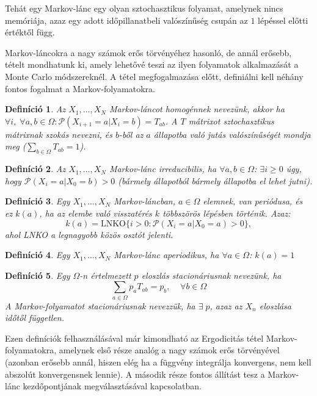 \documentclass[10pt,a4paper]{article}
\numberwithin{equation}{subsection}
\numberwithin{figure}{section}
\newtheorem{definition}{Definíció}[section]
\begin{document}
Tehát egy Markov-lánc egy olyan sztochasztikus folyamat, amelynek nincs memóriája, azaz egy adott időpillanatbeli valószínűség csupán az $1$ lépéssel előtti értéktől függ. 

Markov-láncokra a nagy számok erős törvényéhez hasonló, de annál erősebb, tételt mondhatunk ki, amely lehetővé teszi az ilyen folyamatok alkalmazását a Monte Carlo módszereknél. A tétel megfogalmazása előtt, definiálni kell néhány fontos fogalmat a Markov-folyamatokra.

\begin{definition}
Az $X_1,\dots,X_N$ Markov-láncot homogénnek nevezünk, akkor ha $\forall i,\;\forall a,b\in\Omega: \mathcal{P}(X_{i+1}=a|X_{i}=b)=T_{ab}$. A $T$ mátrixot sztochasztikus mátrixnak szokás nevezni, és $b$-ből az $a$ állapotba való jutás valószínűségét mondja meg  ($\sum_{b\in\Omega}T_{ab}=1$).
\end{definition}

\begin{definition}
Az $X_1,\dots,X_N$ Markov-lánc irreducibilis, ha $\forall a,b\in\Omega$: $\exists i\geq 0$ úgy, hogy $\mathcal{P}(X_i=a|X_{0}=b)>0$ (bármely állapotból bármely állapotba el lehet jutni).
\end{definition}

\begin{definition}
Egy $X_1,\dots,X_N$ Markov-láncban, $a\in \Omega$ elemnek, van periódusa, és ez $k(a)$, ha az elembe való visszatérés $k$ többszörös lépésben történik. Azaz:
\begin{equation}
k(a)=\mathrm{LNKO}\{i>0: \mathcal{P}(X_i=a|X_0=a)>0\},
\end{equation} 
ahol LNKO a legnagyobb közös osztót jelenti.
\end{definition}

\begin{definition}
Egy $X_1,\dots,X_N$ Markov-lánc aperiodikus, ha $\forall a\in\Omega$: $k(a)=1$
\end{definition}

\begin{definition}
Egy $\Omega$-n értelmezett $p$ eloszlás stacionáriusnak nevezünk, ha
\begin{equation}
\sum_{a\in\Omega}p_aT_{ab}=p_b,\;\;\;\;\forall b\in\Omega
\end{equation}
A Markov-folyamatot stacionáriusnak nevezzük, ha $\exists\;p$, azaz az $X_n$ eloszlása időtől független.
\end{definition}

Ezen definíciók felhasználásával már kimondható az Ergodicitás tétel Markov-folyamatokra, amelynek első része  analóg a nagy számok erős törvényével (azonban erősebb annál, hiszen elég ha a függvény integrálja konvergens, nem kell abszolút konvergensnek lennie). A második része fontos állítást tesz a Markov-lánc kezdőpontjának megválasztásával kapcsolatban.
\end{document}

